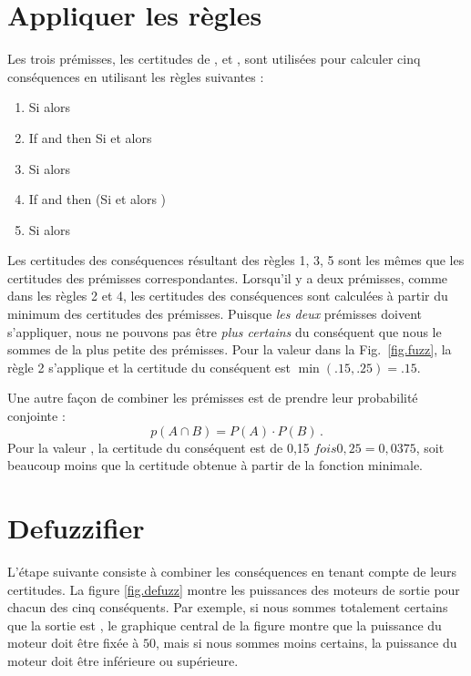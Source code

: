 \section{Appliquer les règles}

Les trois prémisses, les certitudes de ,  et , sont utilisées pour calculer cinq conséquences en utilisant les règles suivantes :

\begin{enumerate}
\item Si  alors 
\item If  and  then  Si  et  alors 
\item Si  alors 
\item If  and  then  (Si  et  alors )
\item Si  alors 
\end{enumerate}

Les certitudes des conséquences résultant des règles 1, 3, 5 sont les mêmes que les certitudes des prémisses correspondantes. Lorsqu'il y a deux prémisses, comme dans les règles 2 et 4, les certitudes des conséquences sont calculées à partir du minimum des certitudes des prémisses. Puisque \emph{les deux} prémisses doivent s'appliquer, nous ne pouvons pas être \emph{plus certains} du conséquent que nous le sommes de la plus petite des prémisses. Pour la valeur  dans la Fig.~\ref{fig.fuzz}, la règle 2 s'applique et la certitude du conséquent est $\min(.15,.25)=.15$.

Une autre façon de combiner les prémisses est de prendre leur probabilité conjointe :
\[
p(A \cap B) = P(A)\cdot P(B)\,.
\]
Pour la valeur , la certitude du conséquent est de 0,15 $ fois 0,25 = 0,0375 $, soit beaucoup moins que la certitude obtenue à partir de la fonction minimale.

\section{Defuzzifier}

L'étape suivante consiste à combiner les conséquences en tenant compte de leurs certitudes. La figure \ref{fig.defuzz} montre les puissances des moteurs de sortie pour chacun des cinq conséquents. Par exemple, si nous sommes totalement certains que la sortie est , le graphique central de la figure montre que la puissance du moteur doit être fixée à $50$, mais si nous sommes moins certains, la puissance du moteur doit être inférieure ou supérieure.


